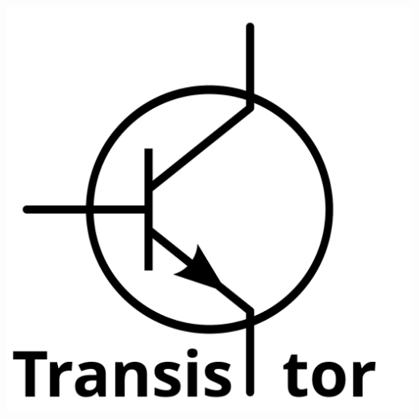 \documentclass{scrartcl}
\begin{document}
{\begin{minipage}{\textwidth}
			\includegraphics[scale=0.07]{transa.png}\\
		\end{minipage}
	}
\end{document}
